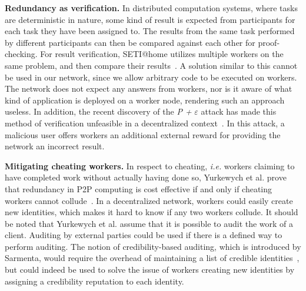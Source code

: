 \textbf{Redundancy as verification.} In distributed computation systems, where tasks are deterministic in nature, some kind of result is expected from participants for each task they have been assigned to. The results from the same task performed by different participants can then be compared against each other for proof-checking. For result verification, SETI@home utilizes multiple workers on the same problem, and then compare their results~\cite{korpela:2001}. A solution similar to this cannot be used in our network, since we allow arbitrary code to be executed on workers. The network does not expect any answers from workers, nor is it aware of what kind of application is deployed on a worker node, rendering such an approach useless. In addition, the recent discovery of the \emph{P +} $\varepsilon$ attack has made this method of verification unfeasible in a decentralized context~\cite{buterin:2015}. In this attack, a malicious user offers workers an additional external reward for providing the network an incorrect result.

\textbf{Mitigating cheating workers.}
In respect to cheating, \textit{i.e.} workers claiming to have completed work without actually having done so, Yurkewych et al. prove that redundancy in P2P computing is cost effective if and only if cheating workers cannot collude~\cite{yurkewych:2005}. In a decentralized network, workers could easily create new identities, which makes it hard to know if any two workers collude. It should be noted that Yurkewych et al. assume that it is possible to audit the work of a client. Auditing by external parties could be used if there is a defined way to perform auditing. The notion of credibility-based auditing, which is introduced by Sarmenta, would require the overhead of maintaining a list of credible identities~\cite{sarmenta:2002}, but could indeed be used to solve the issue of workers creating new identities by assigning a credibility reputation to each identity.

